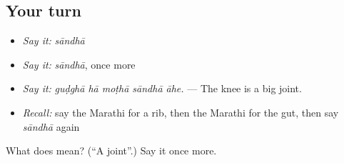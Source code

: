 \subsection*{Your turn}
\begin{itemize}
\raggedright
  \item \emph{Say it:} \emph{sāndhā}
  \item \emph{Say it:} \emph{sāndhā}, once more
  \item \emph{Say it:} \emph{guḍghā hā moṭhā sāndhā āhe.} — The knee is a big joint.
  \item \emph{Recall:} say the Marathi for a rib, then the Marathi for the gut, then say \emph{sāndhā} again
\end{itemize}

\begin{tcolorbox}[breakable,colback=teal!4,colframe=teal!35!black,title={Before you move on}]
What does  mean? (\textquotedblleft{}A joint\textquotedblright{}.) Say it once more.
\end{tcolorbox}
